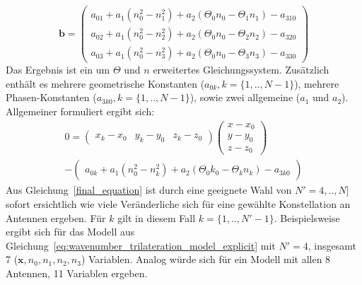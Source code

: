 %
\begin{equation}
\mathbf{b}=
\left(
	\begin{array}{c}
		a_{01}+a_1( n_0^2-n_1^2)+a_2(\Theta_0n_0-\Theta_1n_1)-a_{310} \\
		a_{02}+a_1(n_0^2-n_2^2)+a_2(\Theta_0n_0-\Theta_2n_2)-a_{320} \\
		a_{03}+a_1(n_0^2-n_3^2)+a_2(\Theta_0n_0-\Theta_3n_3)-a_{330}
	\end{array}
\right)
\end{equation}
%
Das Ergebnis ist ein um $\Theta$ und $n$ erweitertes Gleichungssystem. Zusätzlich enthält  es mehrere geometrische Konstanten ($a_{0k}, k=\{1,..,N-1\}$), mehrere Phasen-Konstanten ($a_{3k0}, k=\{1,..,N-1\}$), sowie zwei allgemeine ($a_1$ und $a_2$). Allgemeiner formuliert ergibt sich:
%
\begin{multline}\label{final_equation}
0=
\left(
	\begin{array}{ccc}
		x_k-x_0 & y_k-y_0 & z_k-z_0 
	\end{array}
\right)
\left(
   \begin{array}{c}
	   x-x_0\\
	   y-y_0\\
	   z-z_0
   \end{array}
\right) \\
-
\left(
	\begin{array}{c}
		a_{0k}+a_1(n_0^2-n_k^2)+a_2(\Theta_0k_0-\Theta_kn_k)-a_{3k0}
	\end{array}
	\right)
\end{multline}
%
Aus Gleichung~\eqref{final_equation} ist durch eine geeignete Wahl von $N'={4,..,N}]$ sofort ersichtlich wie viele Veränderliche sich für eine gewählte Konstellation an Antennen ergeben. Für $k$ gilt in diesem Fall $k=\{1,..,N'-1\}$.
%
Beispielsweise ergibt sich für das Modell aus Gleichung~\eqref{eq:wavenumber_trilateration_model_explicit} mit $N'=4$, insgesamt 7 ($\mathbf{x},n_0,n_1,n_2,n_3$) Variablen. Analog würde sich für ein Modell mit allen 8 Antennen, 11 Variablen ergeben.
